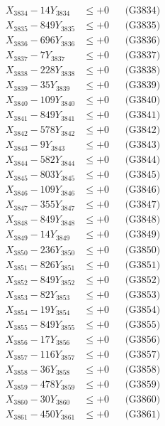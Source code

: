 \documentclass[a4paper,10pt]{article}
\begin{document}
{\begin{align}
X_{3834} - 14Y_{3834} &\leq +0 && \text{(G3834)} \\
X_{3835} - 849Y_{3835} &\leq +0 && \text{(G3835)} \\
X_{3836} - 696Y_{3836} &\leq +0 && \text{(G3836)} \\
X_{3837} - 7Y_{3837} &\leq +0 && \text{(G3837)} \\
X_{3838} - 228Y_{3838} &\leq +0 && \text{(G3838)} \\
X_{3839} - 35Y_{3839} &\leq +0 && \text{(G3839)} \\
X_{3840} - 109Y_{3840} &\leq +0 && \text{(G3840)} \\
\allowbreak
X_{3841} - 849Y_{3841} &\leq +0 && \text{(G3841)} \\
X_{3842} - 578Y_{3842} &\leq +0 && \text{(G3842)} \\
X_{3843} - 9Y_{3843} &\leq +0 && \text{(G3843)} \\
X_{3844} - 582Y_{3844} &\leq +0 && \text{(G3844)} \\
X_{3845} - 803Y_{3845} &\leq +0 && \text{(G3845)} \\
X_{3846} - 109Y_{3846} &\leq +0 && \text{(G3846)} \\
X_{3847} - 355Y_{3847} &\leq +0 && \text{(G3847)} \\
X_{3848} - 849Y_{3848} &\leq +0 && \text{(G3848)} \\
X_{3849} - 14Y_{3849} &\leq +0 && \text{(G3849)} \\
X_{3850} - 236Y_{3850} &\leq +0 && \text{(G3850)} \\
\allowbreak
X_{3851} - 826Y_{3851} &\leq +0 && \text{(G3851)} \\
X_{3852} - 849Y_{3852} &\leq +0 && \text{(G3852)} \\
X_{3853} - 82Y_{3853} &\leq +0 && \text{(G3853)} \\
X_{3854} - 19Y_{3854} &\leq +0 && \text{(G3854)} \\
X_{3855} - 849Y_{3855} &\leq +0 && \text{(G3855)} \\
X_{3856} - 17Y_{3856} &\leq +0 && \text{(G3856)} \\
X_{3857} - 116Y_{3857} &\leq +0 && \text{(G3857)} \\
X_{3858} - 36Y_{3858} &\leq +0 && \text{(G3858)} \\
X_{3859} - 478Y_{3859} &\leq +0 && \text{(G3859)} \\
X_{3860} - 30Y_{3860} &\leq +0 && \text{(G3860)} \\
\allowbreak
X_{3861} - 450Y_{3861} &\leq +0 && \text{(G3861)} \\

\end{align}}
\end{document}
